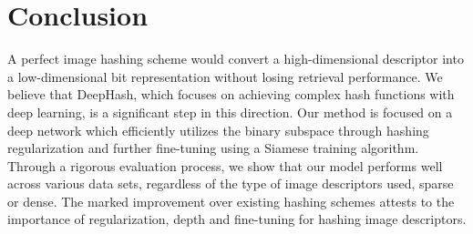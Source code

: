 \documentclass[10pt,twocolumn,letterpaper]{article}
\begin{document}


\section{Conclusion}

A perfect image hashing scheme would convert a high-dimensional descriptor into a low-dimensional bit representation without losing retrieval performance. 
We believe that DeepHash, which focuses on achieving complex hash functions with deep learning, is a significant step in this direction. 
Our method is focused on a deep network which efficiently utilizes the binary subspace through hashing regularization and further fine-tuning using a Siamese training algorithm. 
Through a rigorous evaluation process, we show that our model performs well across various data sets, regardless of the type of image descriptors used, sparse or dense. 
The marked improvement over existing hashing schemes attests to the importance of regularization, depth and fine-tuning for hashing image descriptors.
\end{document}
